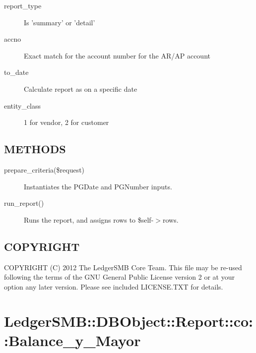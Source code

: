 \begin{description}
\begin{description}
\begin{description}
\begin{description}
\begin{description}
\begin{description}
\begin{description}
\begin{description}
\begin{description}
\begin{description}
\begin{description}
\item[{report\_type}] \mbox{}

Is 'summary' or 'detail'


\item[{accno}] \mbox{}

Exact match for the account number for the AR/AP account


\item[{to\_date}] \mbox{}

Calculate report as on a specific date


\item[{entity\_class}] \mbox{}

1 for vendor, 2 for customer

\end{description}
\subsection*{METHODS\label{LedgerSMB::DBObject::Report::Aging_METHODS}}
\begin{description}

\item[{prepare\_criteria(\$request)}] \mbox{}

Instantiates the PGDate and PGNumber inputs.


\item[{run\_report()}] \mbox{}

Runs the report, and assigns rows to \$self-$>$rows.

\end{description}
\subsection*{COPYRIGHT\label{LedgerSMB::DBObject::Report::Aging_COPYRIGHT}}


COPYRIGHT (C) 2012 The LedgerSMB Core Team.  This file may be re-used following
the terms of the GNU General Public License version 2 or at your option any
later version.  Please see included LICENSE.TXT for details.

\section{LedgerSMB::DBObject::Report::co::Balance\_y\_Mayor\label{LedgerSMB::DBObject::Report::co::Balance_y_Mayor}}



\end{description}
\end{description}
\end{description}
\end{description}
\end{description}
\end{description}
\end{description}
\end{description}
\end{description}
\end{description}
